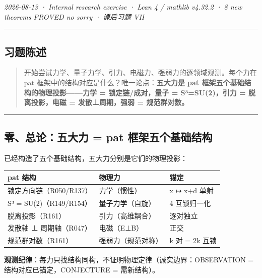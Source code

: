 \documentclass[
]{article}
\newcounter{none} %
\begin{document}
\emph{2026-08-13 · Internal research exercise · Lean 4 / mathlib v4.32.2
· 8 new theorems PROVED no sorry · 课后习题 VII }

\begin{center}\rule{0.5\linewidth}{0.5pt}\end{center}

\subsection{习题陈述}\label{ux4e60ux9898ux9648ux8ff0}

\begin{quote}
开始尝试力学、量子力学、引力、电磁力、强弱力的逐领域观测。每个力在 pat
框架中的结构对应是什么？唯一论点：\textbf{五大力是 pat
框架五个基础结构的物理投影------力学 = 锁定链/成对，量子 =
S³=SU(2)，引力 = 脱离投影，电磁 = 发散⊥周期，强弱 = 规范群对数。}
\end{quote}

\begin{center}\rule{0.5\linewidth}{0.5pt}\end{center}

\subsection{零、总论：五大力 = pat
框架五个基础结构}\label{ux96f6ux603bux8bbaux4e94ux5927ux529b-pat-ux6846ux67b6ux4e94ux4e2aux57faux7840ux7ed3ux6784}

已经构造了五个基础结构，五大力分别是它们的物理投影：

{\def\LTcaptype{none} %
\begin{longtable}[]{@{}lll@{}}
\toprule\noalign{}
pat 结构 & 物理力 & 锚定 \\
\midrule\noalign{}
\endhead
\bottomrule\noalign{}
\endlastfoot
锁定方向链（R050/R137） & 力学（惯性） & x ↦ x+d 单射 \\
S³ = SU(2)（R149/R154） & 量子力学（自旋） & 4 互锁归一化 \\
脱离投影（R161） & 引力（高维耦合） & 逐对独立 \\
发散轴 ⊥ 周期轴（R047） & 电磁（E⊥B） & 正交 \\
规范群对数（R161） & 强弱力（规范对称） & k 对 = 2k 互锁 \\
\end{longtable}
}

\textbf{观测纪律}：每力只找结构同构，不证明物理定律（诚实边界：OBSERVATION
= 结构对应已锚定，CONJECTURE = 需新结构）。
\end{document}
